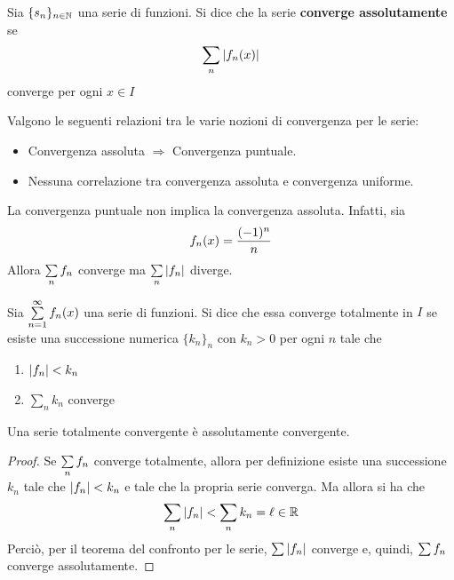 \begin{definition}
    Sia $\{s_n\}_{n \in \mathbb{N}}$ una serie di funzioni. Si dice che la serie \textbf{converge assolutamente}  se
    \begin{equation*}
        \sum_{n}{|f_n(x)|}
    \end{equation*}
    converge per ogni $x \in I$
\end{definition} 
\begin{oss}
Valgono le seguenti relazioni tra le varie nozioni di convergenza per le serie:
\begin{itemize}
    \item Convergenza assoluta $\Rightarrow$ Convergenza puntuale.
    \item  Nessuna correlazione tra convergenza assoluta e convergenza uniforme.
\end{itemize}
\end{oss}
\begin{example}
    La convergenza puntuale non implica la convergenza assoluta. Infatti, sia
    \begin{equation*}
        f_n(x)=\frac{(-1)^n}{n}
    \end{equation*}
    Allora $\sum\limits_{n}{f_n}$ converge ma $\sum\limits_{n}{|f_n|}$ diverge.
\end{example}
\begin{definition}
    Sia $\sum\limits_{n=1}^{\infty}{f_n(x)}$ una serie di funzioni. Si dice che essa converge totalmente in $I$ se esiste una successione numerica $\{k_n\}_n$ con $k_n>0$ per ogni $n$ tale che
    \begin{enumerate}
        \item $|f_n|<k_n$
        \item $\sum\limits_{n}{k_n}$ converge
    \end{enumerate}
\end{definition}
\begin{proposition}
    Una serie totalmente convergente è assolutamente convergente.
\end{proposition}
\begin{proof}
    Se $\sum\limits_{n}f_n$ converge totalmente, allora per definizione esiste una successione $k_n$ tale che $|f_n|<k_n$ e tale che la propria serie converga. Ma allora si ha che
    \begin{equation*}
        \sum_{n}{|f_n|} < \sum_{n}{k_n}= \ell \in \mathbb{R}
    \end{equation*}
    Perciò, per il teorema del confronto per le serie, $\sum\limits{|f_n|}$ converge e, quindi, $\sum\limits{f_n}$ converge assolutamente.
\end{proof}
